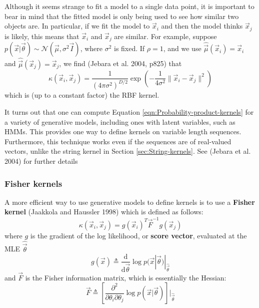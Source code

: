Although it seems strange to fit a model to a single data point, it is important to bear in mind that the fitted model is only being used to see how similar two objects are. In particular, if we fit the model to $\vec{x}_i$ and then the model thinks $\vec{x}_j$ is likely, this means that $\vec{x}_i$ and $\vec{x}_j$ are similar. For example, suppose $p(\vec{x}|\vec{\theta}) \sim \mathcal{N}(\vec{\mu},\sigma^2\vec{I})$, where $\sigma^2$ is fixed. If $\rho=1$, and we use $\hat{\vec{\mu}}(\vec{x}_i)=\vec{x}_i$ and $\hat{\vec{\mu}}(\vec{x}_j)=\vec{x}_j$, we find (Jebara et al. 2004, p825) that
\begin{equation}
\kappa(\vec{x}_i,\vec{x}_j)=\frac{1}{(4\pi\sigma^2)^{D/2}}\exp\left(-\frac{1}{4\sigma^2}\lVert\vec{x}_i-\vec{x}_j\rVert^2\right)
\end{equation}
which is (up to a constant factor) the RBF kernel.

It turns out that one can compute Equation \ref{eqn:Probability-product-kernels} for a variety of generative models, including ones with latent variables, such as HMMs. This provides one way to define kernels on variable length sequences. Furthermore, this technique works even if the sequences are of real-valued vectors, unlike the string kernel in Section \ref{sec:String-kernels}. See (Jebara et al. 2004) for further details


\subsubsection{Fisher kernels}
A more efficient way to use generative models to define kernels is to use a \textbf{Fisher kernel} (Jaakkola and Haussler 1998) which is defined as follows:
\begin{equation}
\kappa(\vec{x}_i,\vec{x}_j)=g(\vec{x}_i)^T\vec{F}^{-1}g(\vec{x}_j)
\end{equation}
where $g$ is the gradient of the log likelihood, or \textbf{score vector}, evaluated at the MLE $\hat{\vec{\theta}}$
\begin{equation}
g(\vec{x}) \triangleq \frac{\mathrm{d}}{\mathrm{d}\vec{\theta}}\log p(\vec{x}|\vec{\theta})|_{\hat{\vec{\theta}}}
\end{equation}
and $\vec{F}$ is the Fisher information matrix, which is essentially the Hessian:
\begin{equation}
\vec{F} \triangleq \left[\frac{\partial^2}{\partial \theta_i \partial \theta_j}\log p(\vec{x}|\vec{\theta})\right]|_{\hat{\vec{\theta}}}
\end{equation}

